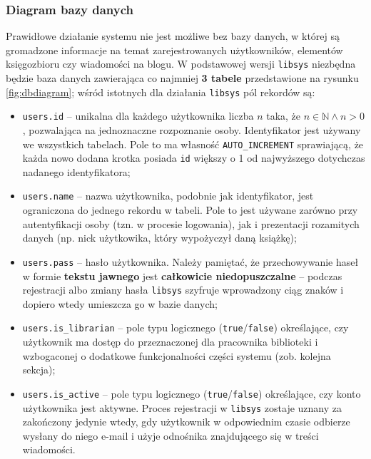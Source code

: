 \documentclass[12pt, a4paper]{article}
\begin{document}
\subsubsection{Diagram bazy danych}
Prawidłowe działanie systemu nie jest możliwe bez bazy danych, w której są gromadzone informacje na temat zarejestrowanych użytkowników, elementów księgozbioru czy wiadomości na blogu. W podstawowej wersji \texttt{libsys} niezbędna będzie baza danych zawierająca co najmniej \textbf{3 tabele} przedstawione na rysunku \ref{fig:dbdiagram}; wśród istotnych dla działania \texttt{libsys} pól rekordów są:

\begin{itemize}
    \item \texttt{users.id} -- unikalna dla każdego użytkownika liczba $n$ taka, że $n \in \mathbb{N} \land n > 0$, pozwalająca na jednoznaczne rozpoznanie osoby. Identyfikator jest używany we wszystkich tabelach. Pole to ma własność \texttt{AUTO\_INCREMENT} sprawiającą, że każda nowo dodana krotka posiada \texttt{id} większy o 1 od najwyższego dotychczas nadanego identyfikatora;
    \item \texttt{users.name} -- nazwa użytkownika, podobnie jak identyfikator, jest ograniczona do jednego rekordu w tabeli. Pole to jest używane zarówno przy autentyfikacji osoby (tzn. w procesie logowania), jak i prezentacji rozamitych danych (np. nick użytkowika, który wypożyczył daną książkę);
    \item \texttt{users.pass} -- hasło użytkownika. Należy pamiętać, że przechowywanie haseł w formie \textbf{tekstu jawnego} jest \textbf{całkowicie niedopuszczalne} -- podczas rejestracji albo zmiany hasła \texttt{libsys} szyfruje wprowadzony ciąg znaków i dopiero wtedy umieszcza go w bazie danych;
    \item \texttt{users.is\_librarian} -- pole typu logicznego (\texttt{true}/\texttt{false}) określające, czy użytkownik ma dostęp do przeznaczonej dla pracownika biblioteki i wzbogaconej o dodatkowe funkcjonalności części systemu (zob. kolejna sekcja);
    \item \texttt{users.is\_active} -- pole typu logicznego (\texttt{true}/\texttt{false}) określające, czy konto użytkownika jest aktywne. Proces rejestracji w \texttt{libsys} zostaje uznany za zakończony jedynie wtedy, gdy użytkownik w odpowiednim czasie odbierze wysłany do niego e-mail i użyje odnośnika znajdującego się w treści wiadomości.
\end{itemize}
\end{document}
